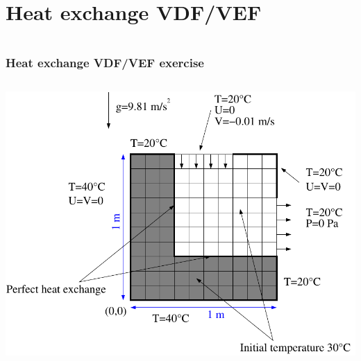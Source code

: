 \documentclass[10pt, hyperref={unicode=true,pdfusetitle, bookmarks=true,bookmarksnumbered=false,bookmarksopen=false, breaklinks=false,pdfborder={0 0 1},backref=true,colorlinks=true,linkcolor=darkblue,pageanchor}]{beamer}
\begin{document}
\section{{\bf{Heat exchange VDF/VEF}}}
\begin{frame}
\begin{columns}[c] 
\tableofcontents[sections={1-9},currentsection, currentsubsection]
\tableofcontents[sections={10-16},currentsection, currentsubsection]
\end{columns}
\end{frame}
\begin{frame}
\frametitle{Heat exchange VDF/VEF exercise}
\begin{block}{}


\begin{columns}[c] 
\begin{center}
\includegraphics[width=1.\textwidth]{PICTURES/heat_exchange.pdf}
\end{center}


\end{columns}
\end{block}
\end{frame}
\end{document}
